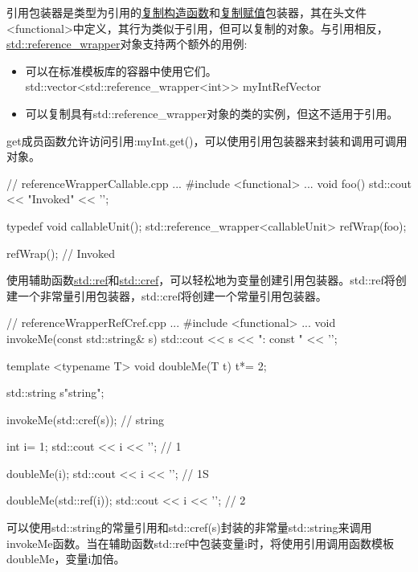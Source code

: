 引用包装器是类型为引用的\href{http://en.cppreference.com/w/cpp/concept/CopyConstructible}{复制构造函数}和\href{http://en.cppreference.com/w/cpp/concept/CopyAssignable}{复制赋值}包装器，其在头文件<functional>中定义，其行为类似于引用，但可以复制的对象。与引用相反，\href{http://en.cppreference.com/w/cpp/utility/functional/reference_wrapper}{std::reference\_wrapper}对象支持两个额外的用例:

\begin{itemize}
\item 
可以在标准模板库的容器中使用它们。std::vector<std::reference\_wrapper<int>{}> myIntRefVector

\item 
可以复制具有std::reference\_wrapper对象的类的实例，但这不适用于引用。
\end{itemize}

get成员函数允许访问引用:myInt.get()，可以使用引用包装器来封装和调用可调用对象。


\begin{cpp}
// referenceWrapperCallable.cpp
...
#include <functional>
...
void foo(){
	std::cout << "Invoked" << '\n';
}

typedef void callableUnit();
std::reference_wrapper<callableUnit> refWrap(foo);

refWrap(); // Invoked
\end{cpp}


使用辅助函数\href{http://en.cppreference.com/w/cpp/utility/functional/ref}{std::ref}和\href{http://en.cppreference.com/w/cpp/utility/functional/ref}{std::cref}，可以轻松地为变量创建引用包装器。std::ref将创建一个非常量引用包装器，std::cref将创建一个常量引用包装器。


\begin{cpp}
// referenceWrapperRefCref.cpp
...
#include <functional>
...
void invokeMe(const std::string& s){
	std::cout << s << ": const " << '\n';
}

template <typename T>
void doubleMe(T t){
	t*= 2;
}

std::string s{"string"};

invokeMe(std::cref(s)); // string

int i= 1;
std::cout << i << '\n'; // 1

doubleMe(i);
std::cout << i << '\n'; // 1S

doubleMe(std::ref(i));
std::cout << i << '\n'; // 2
\end{cpp}

可以使用std::string的常量引用和std::cref(s)封装的非常量std::string来调用invokeMe函数。当在辅助函数std::ref中包装变量i时，将使用引用调用函数模板doubleMe，变量i加倍。


































